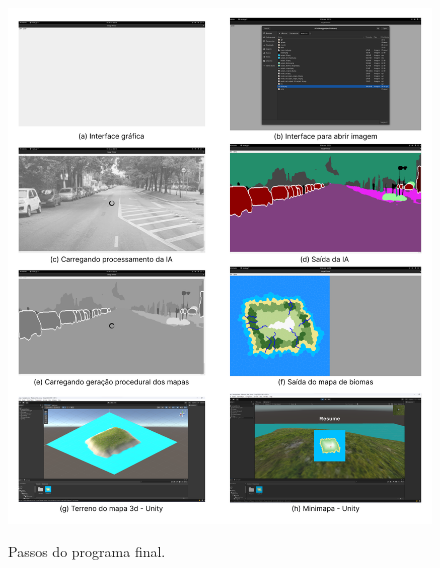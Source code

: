 \begin{figure}[!ht]
	\centering
    \caption{Passos do programa final.}
	\includegraphics[width=\textwidth]{figures/result_final.png}
	\label{fig:combs_result}
\end{figure}

\newpage

